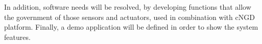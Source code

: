 In addition, software needs will be resolved, by developing functions that allow the government of those sensors and actuators, used in combination with cNGD platform. Finally, a demo application will be defined in order to show the system features.

\vspace{1cm}

\begin{table}[h!]
\Large
{}
\end{table}

\endinput
